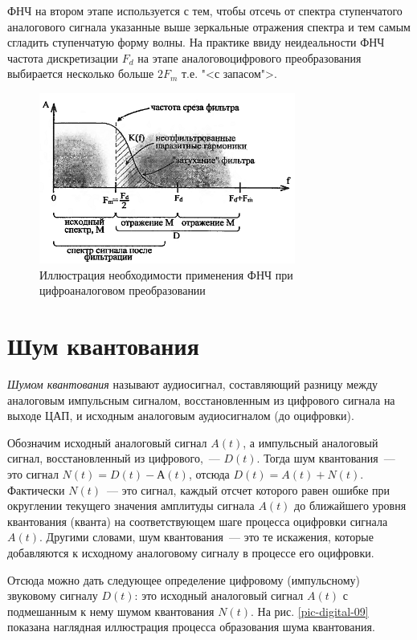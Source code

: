 \documentclass[oneside, final, 14pt]{extreport}
\begin{document}
ФНЧ на втором этапе используется с тем, чтобы отсечь от спектра ступенчатого аналогового сигнала указанные выше зеркальные отражения спектра и тем самым сгладить ступенчатую форму волны. На практике ввиду неидеальности ФНЧ частота дискретизации $F_d$ на этапе аналоговоцифрового преобразования выбирается несколько больше $2F_m$ т.е. "<с запасом">. 

\begin{figure}[h]
\centering
\includegraphics[width=0.75\textwidth]{pic-digital-08}
\caption{Иллюстрация необходимости применения ФНЧ при цифроаналоговом преобразовании}
\label{pic-digital-08}
\end{figure}

\section{Шум квантования}
\textit{Шумом квантования} называют аудиосигнал, составляющий разницу между аналоговым импульсным сигналом, восстановленным из цифрового сигнала на выходе ЦАП, и исходным аналоговым аудиосигналом (до оцифровки). 

Обозначим исходный аналоговый сигнал $A(t)$, а импульсный аналоговый сигнал, восстановленный из цифрового,~--- $D(t)$. Тогда шум квантования~--- это сигнал $N(t)=D(t)-А(t)$, отсюда $D(t)=A(t)+N(t)$. Фактически $N(t)$~--- это сигнал, каждый отсчет которого равен ошибке при округлении текущего значения амплитуды сигнала $A(t)$ до ближайшего уровня квантования (кванта) на соответствующем шаге процесса оцифровки сигнала $A(t)$. Другими словами, шум квантования~--- это те искажения, которые добавляются к исходному аналоговому сигналу в процессе его оцифровки.

Отсюда можно дать следующее определение цифровому (импульсному) звуковому сигналу $D(t)$: это исходный аналоговый сигнал $A(t)$ с подмешанным к нему шумом квантования $N(t)$. На рис. \ref{pic-digital-09} показана наглядная иллюстрация процесса образования шума квантования.
\end{document}
